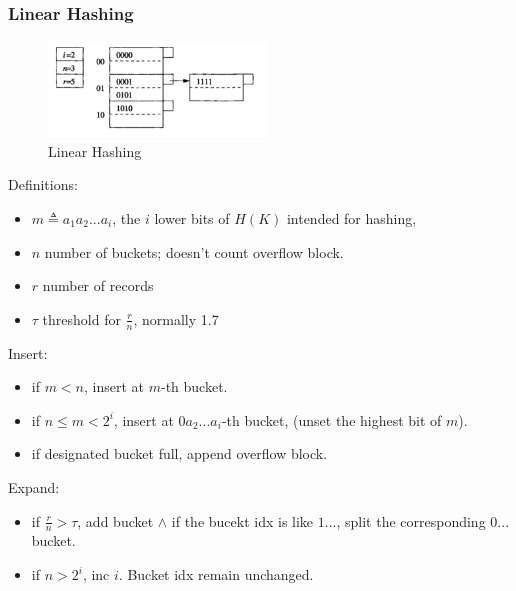\documentclass{article}
\begin{document}
\subsubsection{Linear Hashing}
\begin{figure}[H]
        \centerline{\includegraphics[height = 1in]{img/linearhashing}}
        \caption{Linear Hashing}
    \label{fig:linearHashing}
\end{figure}
Definitions:
\begin{itemize}
\item $m \triangleq a_1a_2...a_i$, the $i$ lower bits of $H(K)$ intended for hashing,
\item $n$ number of buckets; doesn't count overflow block. 
\item $r$ number of records
\item $\tau$ threshold for $\frac{r}{n}$, normally 1.7 
\end{itemize}
Insert: 
\begin{itemize}
\item if $m<n$, insert at $m$-th bucket.
\item if $n\leq m < 2^i$, insert at $0a_2...a_i$-th bucket, (unset the highest bit of $m$).
\item if designated bucket full, append overflow block. 
\end{itemize}
Expand:
\begin{itemize}
\item if $\frac{r}{n}>\tau$, add bucket $\wedge$ if the bucekt idx is like $1...$, split the corresponding $0...$ bucket. 
\item if $n>2^i$, inc $i$. Bucket idx remain unchanged. 
\end{itemize}
\end{document}
